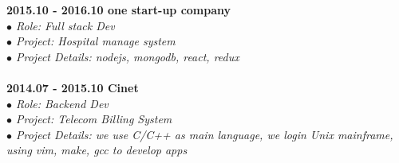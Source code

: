 \documentclass[a3paper,12pt,final]{memoir}
\newcommand{\myThemeColor}{RoyalBlue}
\newcommand{\SmallSep}{\vspace{0.9em}}
\newcommand{\CVSection}[1]
	{\Large\textbf{#1}\par
	\vspace{0.2cm}\normalsize\normalfont}
\newcommand{\CVItem}[1]
	{\textbf{\color{\myThemeColor} #1}}
\begin{document}
\begin{CJK*}{UTF8}{gbsn}
\CVItem{2015.10 - 2016.10 \hfill one start-up company}\\
\textit{$\bullet$ Role: Full stack Dev} \\
\textit{$\bullet$ Project: Hospital manage system} \\
\textit{$\bullet$ Project Details: nodejs, mongodb, react, redux} \\
\\
\CVItem{2014.07 - 2015.10 \hfill Cinet}\\
\textit{$\bullet$ Role: Backend Dev} \\
\textit{$\bullet$ Project: Telecom Billing System} \\
\textit{$\bullet$ Project Details: we use C/C++ as main language, we login Unix mainframe, using vim, make, gcc to develop apps} \\


\end{CJK*}
\end{document}
